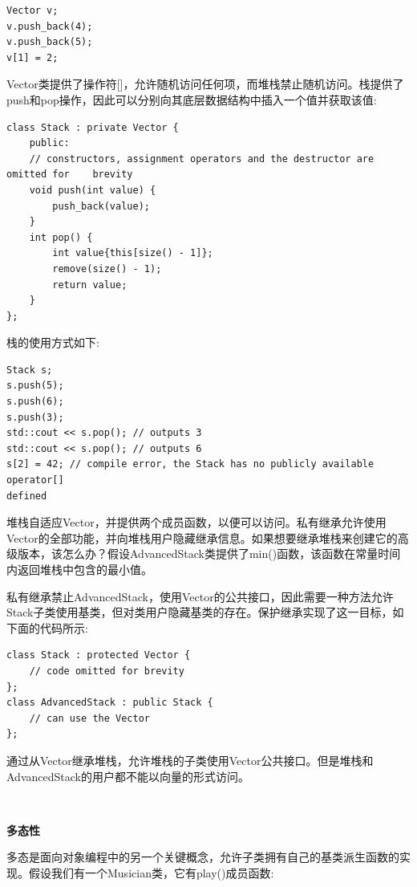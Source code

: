 \begin{lstlisting}[caption={}]
Vector v;
v.push_back(4);
v.push_back(5);
v[1] = 2;
\end{lstlisting}

Vector类提供了操作符[]，允许随机访问任何项，而堆栈禁止随机访问。栈提供了push和pop操作，因此可以分别向其底层数据结构中插入一个值并获取该值:\par

\begin{lstlisting}[caption={}]
class Stack : private Vector {
	public:
	// constructors, assignment operators and the destructor are omitted for	brevity
	void push(int value) {
		push_back(value);
	}
	int pop() {
		int value{this[size() - 1]};
		remove(size() - 1);
		return value;
	}
};
\end{lstlisting}

栈的使用方式如下: \par

\begin{lstlisting}[caption={}]
Stack s;
s.push(5);
s.push(6);
s.push(3);
std::cout << s.pop(); // outputs 3
std::cout << s.pop(); // outputs 6
s[2] = 42; // compile error, the Stack has no publicly available operator[]
defined
\end{lstlisting}

堆栈自适应Vector，并提供两个成员函数，以便可以访问。私有继承允许使用Vector的全部功能，并向堆栈用户隐藏继承信息。如果想要继承堆栈来创建它的高级版本，该怎么办？假设AdvancedStack类提供了min()函数，该函数在常量时间内返回堆栈中包含的最小值。\par
私有继承禁止AdvancedStack，使用Vector的公共接口，因此需要一种方法允许Stack子类使用基类，但对类用户隐藏基类的存在。保护继承实现了这一目标，如下面的代码所示: \par

\begin{lstlisting}[caption={}]
class Stack : protected Vector {
	// code omitted for brevity
};
class AdvancedStack : public Stack {
	// can use the Vector
};
\end{lstlisting}

通过从Vector继承堆栈，允许堆栈的子类使用Vector公共接口。但是堆栈和AdvancedStack的用户都不能以向量的形式访问。 \par

\noindent\textbf{}\ \par
\textbf{多态性} \ \par
多态是面向对象编程中的另一个关键概念，允许子类拥有自己的基类派生函数的实现。假设我们有一个Musician类，它有play()成员函数: \par

